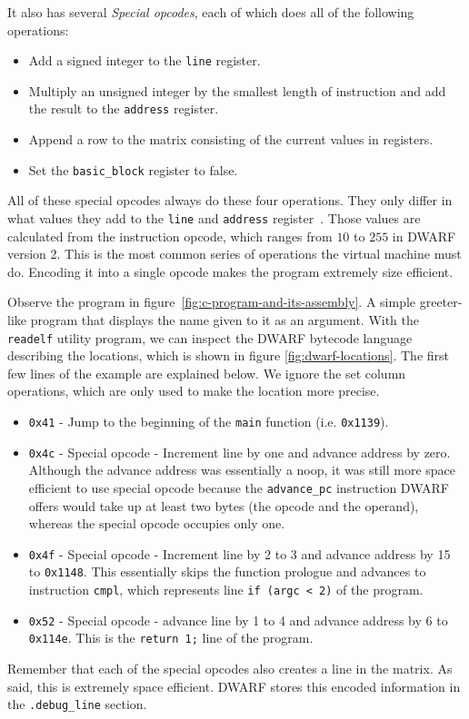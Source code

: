 It also has several \textit{Special opcodes}, each of which does all of the
following operations:
\begin{itemize}
    \item Add a signed integer to the \texttt{line} register.
    \item Multiply an unsigned integer by the smallest length of instruction
        and add the result to the \texttt{address} register.
    \item Append a row to the matrix consisting of the current values in
        registers.
    \item Set the \texttt{basic\_block} register to false.
\end{itemize}
All of these special opcodes always do these four operations. They only differ
in what values they add to the \texttt{line} and \texttt{address}
register~\cite{dwarf}. Those values are calculated from the instruction opcode,
which ranges from $10$ to $255$ in DWARF version 2. This is the most common
series of operations the virtual machine must do. Encoding it into a single
opcode makes the program extremely size efficient.

Observe the program in figure~\ref{fig:c-program-and-its-assembly}. A simple
greeter-like program that displays the name given to it as an argument. With
the \texttt{readelf} utility program, we can inspect the DWARF bytecode
language describing the locations, which is shown in figure
\ref{fig:dwarf-locations}. The first few lines of the example are explained
below. We ignore the set column operations, which are only used to make the
location more precise.
\begin{itemize}
    \item \texttt{0x41} - Jump to the beginning of the \texttt{main} function
        (i.e. \texttt{0x1139}).
    \item \texttt{0x4c} - Special opcode - Increment line by one and advance
        address by zero. Although the advance address was essentially a noop,
        it was still more space efficient to use special opcode because the
        \texttt{advance\_pc} instruction DWARF offers would take up at least
        two bytes (the opcode and the operand), whereas the special opcode
        occupies only one.
    \item \texttt{0x4f} - Special opcode - Increment line by 2 to 3 and advance
        address by 15 to \texttt{0x1148}. This essentially skips the function
        prologue and advances to instruction \texttt{cmpl}, which represents
        line \texttt{if (argc < 2)} of the program.
    \item \texttt{0x52} - Special opcode - advance line by 1 to 4 and advance
        address by 6 to \texttt{0x114e}. This is the \texttt{return 1;}
        line of the program.
\end{itemize}
Remember that each of the special opcodes also creates a line in the matrix. As
said, this is extremely space efficient. DWARF stores this encoded information
in the \verb|.debug_line| section.

